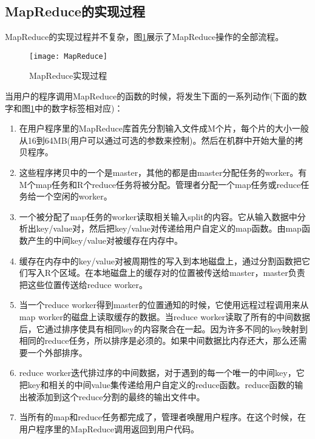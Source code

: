 \subsection[MapReduce的实现过程]{MapReduce的实现过程\cite{paper:Google-MapReduce}}
MapReduce的实现过程并不复杂，图\ref{fig:MapReduce}展示了MapReduce操作的全部流程。
\begin{figure}[h]
 \centering
 \texttt{[image: MapReduce]}
 \caption{MapReduce实现过程}
 \label{fig:MapReduce}
\end{figure}

当用户的程序调用MapReduce的函数的时候，将发生下面的一系列动作(下面的数字和图\ref{fig:MapReduce}中的数字标签相对应)：

\begin{enumerate}
\item 在用户程序里的MapReduce库首先分割输入文件成M个片，每个片的大小一般从16到64MB(用户可以通过可选的参数来控制)。然后在机群中开始大量的拷贝程序。

\item 这些程序拷贝中的一个是master，其他的都是由master分配任务的worker。有M个map任务和R个reduce任务将被分配。管理者分配一个map任务或reduce任务给一个空闲的worker。

\item 一个被分配了map任务的worker读取相关输入split的内容。它从输入数据中分析出key/value对，然后把key/value对传递给用户自定义的map函数。由map函数产生的中间key/value对被缓存在内存中。

\item 缓存在内存中的key/value对被周期性的写入到本地磁盘上，通过分割函数把它们写入R个区域。在本地磁盘上的缓存对的位置被传送给master，master负责把这些位置传送给reduce worker。

\item 当一个reduce worker得到master的位置通知的时候，它使用远程过程调用来从map worker的磁盘上读取缓存的数据。当reduce worker读取了所有的中间数据后，它通过排序使具有相同key的内容聚合在一起。因为许多不同的key映射到相同的reduce任务，所以排序是必须的。如果中间数据比内存还大，那么还需要一个外部排序。

\item reduce worker迭代排过序的中间数据，对于遇到的每一个唯一的中间key，它把key和相关的中间value集传递给用户自定义的reduce函数。reduce函数的输出被添加到这个reduce分割的最终的输出文件中。

\item 当所有的map和reduce任务都完成了，管理者唤醒用户程序。在这个时候，在用户程序里的MapReduce调用返回到用户代码。
\end{enumerate}

